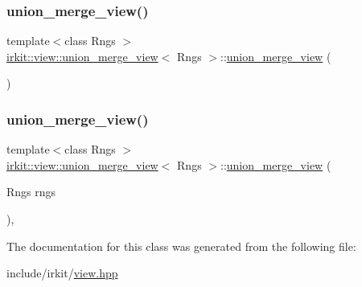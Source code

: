 \subsubsection{\texorpdfstring{union\+\_\+merge\+\_\+view()}{union\_merge\_view()}\hspace{0.1cm}{\footnotesize\ttfamily [1/2]}}
{\footnotesize\ttfamily template$<$class Rngs $>$ \\
\hyperlink{classirkit_1_1view_1_1union__merge__view}{irkit\+::view\+::union\+\_\+merge\+\_\+view}$<$ Rngs $>$\+::\hyperlink{classirkit_1_1view_1_1union__merge__view}{union\+\_\+merge\+\_\+view} (\begin{DoxyParamCaption}{ }\end{DoxyParamCaption})\hspace{0.3cm}{\ttfamily [default]}}

\mbox{\label{classirkit_1_1view_1_1union__merge__view_af2e80cdce25cdfd8db01a868a4dbf964}} 
\subsubsection{\texorpdfstring{union\+\_\+merge\+\_\+view()}{union\_merge\_view()}\hspace{0.1cm}{\footnotesize\ttfamily [2/2]}}
{\footnotesize\ttfamily template$<$class Rngs $>$ \\
\hyperlink{classirkit_1_1view_1_1union__merge__view}{irkit\+::view\+::union\+\_\+merge\+\_\+view}$<$ Rngs $>$\+::\hyperlink{classirkit_1_1view_1_1union__merge__view}{union\+\_\+merge\+\_\+view} (\begin{DoxyParamCaption}\item[{Rngs}]{rngs }\end{DoxyParamCaption})\hspace{0.3cm}{\ttfamily [inline]}, {\ttfamily [explicit]}}



The documentation for this class was generated from the following file\+:\begin{DoxyCompactItemize}
\item 
include/irkit/\hyperlink{view_8hpp}{view.\+hpp}\end{DoxyCompactItemize}
